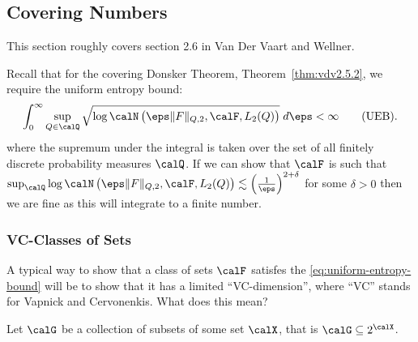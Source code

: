 
\subsection{Covering Numbers}%
\label{subsec:covering}

This section roughly covers section 2.6 in Van Der Vaart and Wellner.

Recall that for the covering Donsker Theorem, Theorem~\ref{thm:vdv2.5.2}, we require the uniform entropy bound:
\[
	\int_{0}^{\infty}  \sup_{Q\in\calQ} \sqrt{\log \calN\left(\eps\|F\|_{Q,2},\calF,L_2(Q)\right)}\;d\eps < \infty\tag{UEB}\label{eq:uniform-entropy-bound-2}
.\] 
where the supremum under the integral is taken over the set of all finitely discrete probability measures \(\calQ\). If we can show that \(\calF\) is such that \(\sup_\calQ \log \calN\left(\eps\|F\|_{Q,2},\calF,L_2(Q)\right) \lesssim \left(\frac{1}{\eps}\right)^{2+\delta}\) for some \(\delta > 0\) then we are fine as this will integrate to a finite number.

\subsubsection{VC-Classes of Sets}%
\label{subsubsec:vc-class}

A typical way to show that a class of sets \(\calF\) satisfes the \eqref{eq:uniform-entropy-bound} will be to show that it has a limited ``VC-dimension'', where ``VC'' stands for Vapnick and Cervonenkis. What does this mean?

Let \(\calG\) be a collection of subsets of some set \(\calX\), that is \(\calG \subseteq 2^\calX\).


